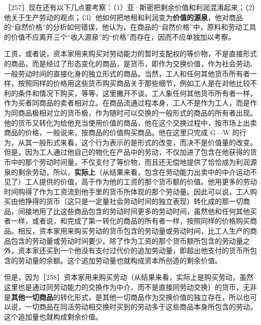 ［257］\fontbox{~\{}现在还有以下几点要考察：（1）亚·斯密把剩余价值和利润混淆起来；（2）他关于生产劳动的观点；（3）他如何把地租和利润变为\textbf{价值的源泉}，他对商品的“自然价格”的分析如何错误，他认为，在商品的“自然价格”中，原料和劳动工具的价值不应离开三个“收入源泉”的“价格”而存在，因而不应单独加以考察。\fontbox{\}~}


工资，或者说，资本家用来购买对劳动能力的暂时支配权的等价物，不是直接形式的商品，而是经过了形态变化的商品，是货币，即作为交换价值，作为社会劳动、一般劳动时间的直接化身的独立形式的商品。当然，工人和任何其他货币所有者一样，按照同样的价格用这些货币购买商品\fontbox{~\{}关于那些细节，例如工人是在对他比较不利的条件和情况下购买，等等，这里撇开不谈\fontbox{\}~}。工人象任何其他货币所有者一样，作为买者同商品的卖者相对立。在商品流通过程本身，工人不是作为工人，而是作为同商品极相对立的货币极，作为随时可以交换的一般形式的商品的所有者出现。他的货币又转化为给他充当使用价值的商品，他在这个交换过程中，按市场上出卖商品的价格，一般说来，按商品的价值购买商品。他在这里只完成 G—W 的行为，从其一般形式来看，这个行为表示的是形式的改变，而决不是价值量的改变。但是，因为工人通过他自己的物化在产品中的劳动，不仅加进了包含在他获得的货币中的那个劳动时间量，不仅支付了等价物，而且还无偿地提供了恰恰成为利润源泉的剩余劳动，所以，\textbf{实际上}（从结果来看，包含在劳动能力出卖中的中介运动不见了）工人提供的价值，高于作为他的工资的那个货币额的价值。他用更多的劳动时间购得了作为工资流到他手里的货币所体现的那个劳动量。因此可以说，工人购买由他挣得的货币（这只是一定量社会劳动时间的独立表现）转化成的那一切商品，间接地用了比这些商品包含的劳动时间更多的劳动时间，虽然他和任何其他买者一样，或者说，和完成了第一转化的商品的所有者一样，按照同样的价格购买商品。相反，资本家用来购买劳动的货币包含的劳动量或劳动时间，比工人生产的商品包含的劳动量或劳动时间要少。除了作为工资的那个货币额所包含的劳动量之外，资本家还买到一个他没有支付过代价的追加劳动量，即超出他支付的货币所包含的劳动量的余额。这个追加劳动量也就构成资本所创造的剩余价值。

但是，因为［258］资本家用来购买劳动（从结果来看，实际上是购买劳动，虽然这里也是通过同劳动能力的交换作为中介，而不是直接同劳动交换）的货币，无非是\textbf{其他一切商品}的转化形式，是其他一切商品作为交换价值的独立存在，所以也可以说，一切商品在同活劳动相交换时买到的劳动多于这些商品本身所包含的劳动。这个追加量也就构成剩余价值。

